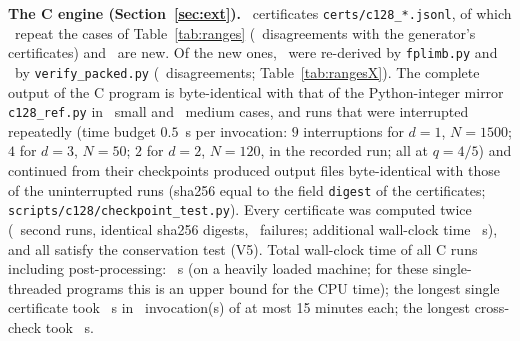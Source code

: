 \documentclass[11pt,a4paper]{article}
\theoremstyle{definition}
\theoremstyle{remark}
\begin{document}
\textbf{The C engine (Section~\ref{sec:ext}).} \XTotalCerts\ certificates \texttt{certs/c128\_*.jsonl}, of which \XRegressN\ repeat the cases of Table~\ref{tab:ranges} (\XRegressBad\ disagreements with the generator's certificates) and \XTotalNew\ are new. Of the new ones, \XXLimb\ were re-derived by \texttt{fplimb.py} and \XXPacked\ by \texttt{verify\_packed.py} (\XXBad\ disagreements; Table~\ref{tab:rangesX}). The complete output of the C program is byte-identical with that of the Python-integer mirror \texttt{c128\_ref.py} in \XRefSmall\ small and \XRefMedium\ medium cases, and runs that were interrupted repeatedly (time budget $0.5$~s per invocation: $9$ interruptions for $d=1$, $N=1500$; $4$ for $d=3$, $N=50$; $2$ for $d=2$, $N=120$, in the recorded run; all at $q=4/5$) and continued from their checkpoints produced output files byte-identical with those of the uninterrupted runs (sha256 equal to the field \texttt{digest} of the certificates; \texttt{scripts/c128/checkpoint\_test.py}).
Every certificate was computed twice (\XRecheckN\ second runs, identical sha256 digests, \XRecheckBad\ failures; additional wall-clock time \XRecheckCpu~s), and all satisfy the conservation test (V5). Total wall-clock time of all C runs including post-processing: \XCpu~s (on a heavily loaded machine; for these single-threaded programs this is an upper bound for the CPU time); the longest single certificate took \XMaxSeconds~s in \XMaxCalls\ invocation(s) of at most 15 minutes each; the longest cross-check took \XMaxXSeconds~s.
\end{document}
